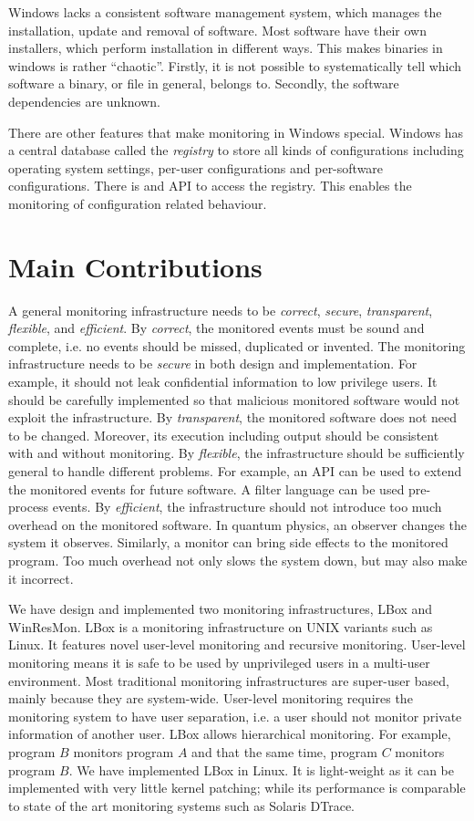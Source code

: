 Windows lacks a consistent software management system, which manages
the installation, update and removal of software.
Most software have their own installers, which perform installation in
different ways.
This makes binaries in windows is rather ``chaotic''.
Firstly, it is not possible to systematically tell which software a binary,
or file in general, belongs to.
Secondly, the software dependencies are unknown.

There are other features that make monitoring in Windows special.
Windows has a central database called the {\em registry} to store
all kinds of configurations including operating system settings,
per-user configurations and per-software configurations.
There is and API to access the registry.
This enables the monitoring of configuration related behaviour.

\section{Main Contributions}
\label{sec:contribution}

A general monitoring infrastructure needs to be
{\em correct}, {\em secure}, {\em transparent}, {\em flexible}, and {\em efficient}.
By {\em correct}, the monitored events must be sound and complete, i.e.
no events should be missed, duplicated or invented.
The monitoring infrastructure needs to be {\em secure} in both design and implementation.
For example, it should not leak confidential information to low privilege users.
It should be carefully implemented so that malicious monitored
software would not exploit the infrastructure.
By {\em transparent}, the monitored software does not need to be changed.
Moreover, its execution including output should be consistent with and without
monitoring.
By {\em flexible}, the infrastructure should be sufficiently general to
handle different problems.
For example, an API can be used to extend the monitored events for future software.
A filter language can be used pre-process events.
By {\em efficient}, the infrastructure should not introduce too much
overhead on the monitored software.
In quantum physics, an observer changes the system it observes.
Similarly, a monitor can bring side effects to the monitored program.
Too much overhead not only slows the system down, but may also make
it incorrect.

We have design and implemented two monitoring infrastructures,
LBox and WinResMon.
LBox \cite{wu2005user} is a monitoring infrastructure on UNIX variants such as Linux.
It features novel user-level monitoring and recursive monitoring.
User-level monitoring means it is
safe to be used by unprivileged users in a multi-user environment.
Most traditional monitoring infrastructures are super-user based,
mainly because they are system-wide.
User-level monitoring requires the monitoring system to have user separation,
i.e. a user should not monitor private information of another user.
LBox allows hierarchical monitoring.
For example, program $B$ monitors program $A$ and that the same time,
program $C$ monitors program $B$.
We have implemented LBox in Linux.
It is light-weight as it can be implemented with very little kernel patching;
while its performance is comparable to state of the art monitoring systems
such as Solaris DTrace.

